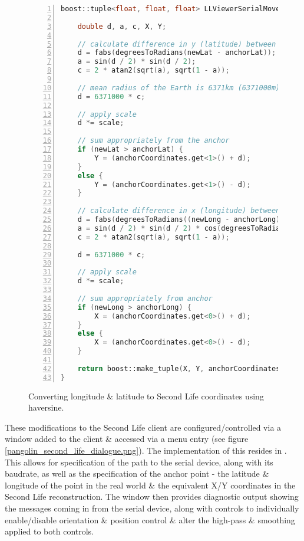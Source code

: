 \begin{figure}[h]
\begin{lstlisting}[language=C++, numbers=left, numberstyle=\small, stepnumber=1, frame=single, breaklines=true, backgroundcolor=\color{codebackground}, showstringspaces=false]
boost::tuple<float, float, float> LLViewerSerialMovement::latitudeLongitudeToRegionCoordinate(double newLat, double newLong, float anchorLat, float anchorLong, float scale, boost::tuple<float, float, float> anchorCoordinates) {

    double d, a, c, X, Y;

    // calculate difference in y (latitude) between anchor & new reading
    d = fabs(degreesToRadians(newLat - anchorLat));
    a = sin(d / 2) * sin(d / 2);
    c = 2 * atan2(sqrt(a), sqrt(1 - a));

    // mean radius of the Earth is 6371km (6371000m)
    d = 6371000 * c;

    // apply scale
    d *= scale;

    // sum appropriately from the anchor
    if (newLat > anchorLat) {
        Y = (anchorCoordinates.get<1>() + d);
    }
    else {
        Y = (anchorCoordinates.get<1>() - d);
    }

    // calculate difference in x (longitude) between anchor & new reading
    d = fabs(degreesToRadians((newLong - anchorLong)));
    a = sin(d / 2) * sin(d / 2) * cos(degreesToRadians(newLat)) * cos(degreesToRadians(anchorLat));
    c = 2 * atan2(sqrt(a), sqrt(1 - a));
    
    d = 6371000 * c;

    // apply scale
    d *= scale;

    // sum appropriately from anchor
    if (newLong > anchorLong) {
        X = (anchorCoordinates.get<0>() + d);
    }
    else {
        X = (anchorCoordinates.get<0>() - d);
    }

    return boost::make_tuple(X, Y, anchorCoordinates.get<2>());
}
\end{lstlisting}
\caption{Converting longitude \& latitude to Second Life coordinates using haversine.}
\label{secondlifehaversine}
\end{figure}

These modifications to the Second Life client are configured/controlled via a window added to the client \& accessed via a menu entry (see figure \ref{pangolin_second_life_dialogue.png}). The implementation of this resides in . This allows for specification of the path to the serial device, along with its baudrate, as well as the specification of the anchor point - the latitude \& longitude of the point in the real world \& the equivalent X/Y coordinates in the Second Life reconstruction. The window then provides diagnostic output showing the messages coming in from the serial device, along with controls to individually enable/disable orientation \& position control \& alter the high-pass \& smoothing applied to both controls.

